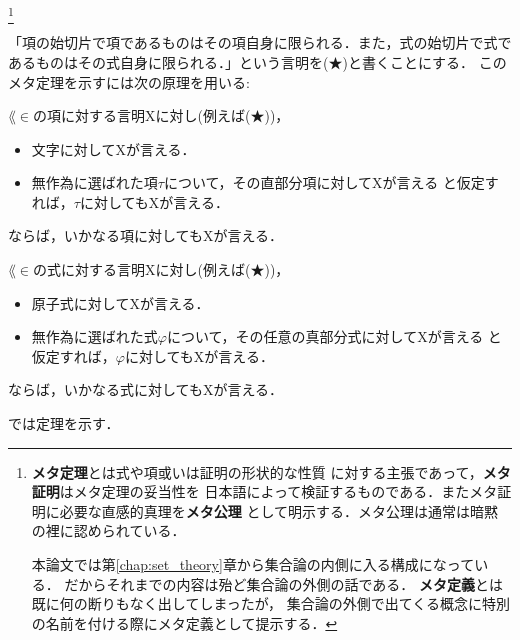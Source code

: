 	\footnote[0]{
		{\bf メタ定理}とは式や項或いは証明の形状的な性質
		に対する主張であって，{\bf メタ証明}はメタ定理の妥当性を
		日本語によって検証するものである．またメタ証明に必要な直感的真理を{\bf メタ公理}
		として明示する．メタ公理は通常は暗黙の裡に認められている．
		
		本論文では第\ref{chap:set_theory}章から集合論の内側に入る構成になっている．
		だからそれまでの内容は殆ど集合論の外側の話である．
		{\bf メタ定義}とは既に何の断りもなく出してしまったが，
		集合論の外側で出てくる概念に特別の名前を付ける際にメタ定義として提示する．
	}
	
	「項の始切片で項であるものはその項自身に限られる．また，式の始切片で式であるものはその式自身に限られる．」という言明を(★)と書くことにする．
	このメタ定理を示すには次の原理を用いる:
	
	\begin{screen}
		\begin{metaaxm}
		\label{metaaxm:induction_principle_of_L_in_terms}
			$\lang{\in}$の項に対する言明Xに対し(例えば(★))，
			\begin{itemize}
				\item 文字に対してXが言える．
				\item 無作為に選ばれた項$\tau$について，その直部分項に対してXが言える
					と仮定すれば，$\tau$に対してもXが言える．
			\end{itemize}
			ならば，いかなる項に対してもXが言える．
		\end{metaaxm}
	\end{screen}
	
	\begin{screen}
		\begin{metaaxm}
		\label{metaaxm:induction_principle_of_L_in_formulas}
			$\lang{\in}$の式に対する言明Xに対し(例えば(★))，
			\begin{itemize}
				\item 原子式に対してXが言える．
				\item 無作為に選ばれた式$\varphi$について，その任意の真部分式に対してXが言える
					と仮定すれば，$\varphi$に対してもXが言える．
			\end{itemize}
			ならば，いかなる式に対してもXが言える．
		\end{metaaxm}
	\end{screen}
	
	では定理を示す．
	
